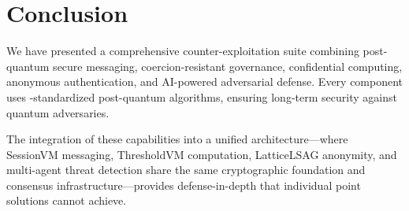 \documentclass[11pt,letterpaper]{article}
\begin{document}
\section{Conclusion}

We have presented a comprehensive counter-exploitation suite combining post-quantum secure messaging, coercion-resistant governance, confidential computing, anonymous authentication, and AI-powered adversarial defense. Every component uses \nist{}-standardized post-quantum algorithms, ensuring long-term security against quantum adversaries.

The integration of these capabilities into a unified architecture---where SessionVM messaging, ThresholdVM computation, LatticeLSAG anonymity, and multi-agent threat detection share the same cryptographic foundation and consensus infrastructure---provides defense-in-depth that individual point solutions cannot achieve.
\end{document}
